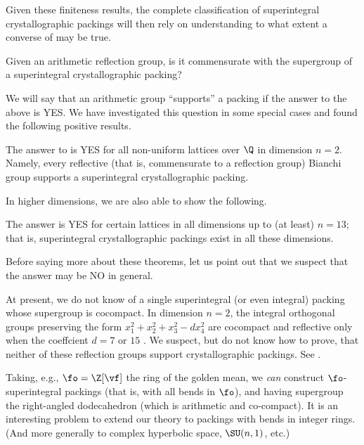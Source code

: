 \documentclass[12pt,reqno]{amsart}
\begin{document}
Given these finiteness results, the complete classification of superintegral crystallographic packings will then rely on understanding to what extent a converse of  may be true.


\begin{question}\label{q:conv}
Given an arithmetic reflection group, is it commensurate with the supergroup of a superintegral crystallographic packing?
\end{question}

We will say that an arithmetic group ``supports'' a packing if the answer to the above is YES.
We have investigated this question in some special cases and found the following positive results.

\begin{thm}\label{thm:17}
The answer to  is YES for all non-uniform lattices over $\Q$ in dimension $n=2$. Namely, every reflective (that is,  commensurate to a  reflection group)  Bianchi group supports a superintegral crystallographic packing.
\end{thm}

In higher dimensions, we are also able to show the following.

\begin{thm}\label{thm:highDim}
The answer is YES for certain lattices in all dimensions up to (at least) $n=13$; that is,
superintegral crystallographic packings exist in all these dimensions. %
\end{thm}


Before saying more about
 these theorems, let us point out that we suspect that the answer may be NO in general.
\begin{rmk}\label{rmk:coComp1}
At present, we do not know of a single superintegral (or even integral) packing whose supergroup is cocompact. In dimension $n=2$, the integral orthogonal groups preserving the form $x_1^2+x_2^2+x_3^2-dx_4^2$ are cocompact and reflective only when the coeffcient $d=7$ or $15$ \cite{McleodThesis}. We suspect, but do not know how to prove, that neither of these reflection groups support crystallographic packings. See .
\end{rmk}
\begin{rmk}
 Taking, e.g.,  $\fo=\Z[\vf]$  the ring of the golden mean, we {\it can} construct $\fo$-superintegral packings (that is, with all bends in $\fo$), and having supergroup %
 the right-angled dodecahedron (which is arithmetic and co-compact).
It is an interesting problem to extend our theory to packings with bends in integer rings. (And more generally to complex hyperbolic space, $\SU(n,1)$, etc.)
\end{rmk}
\end{document}
